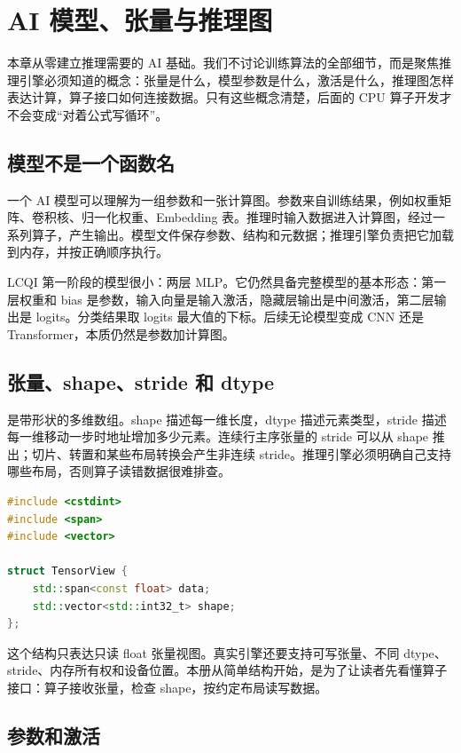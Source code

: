 \chapter{AI 模型、张量与推理图}

本章从零建立推理需要的 AI 基础。我们不讨论训练算法的全部细节，而是聚焦推理引擎必须知道的概念：张量是什么，模型参数是什么，激活是什么，推理图怎样表达计算，算子接口如何连接数据。只有这些概念清楚，后面的 CPU 算子开发才不会变成“对着公式写循环”。

\section{模型不是一个函数名}

一个 AI 模型可以理解为一组参数和一张计算图。参数来自训练结果，例如权重矩阵、卷积核、归一化权重、Embedding 表。推理时输入数据进入计算图，经过一系列算子，产生输出。模型文件保存参数、结构和元数据；推理引擎负责把它加载到内存，并按正确顺序执行。

LCQI 第一阶段的模型很小：两层 MLP。它仍然具备完整模型的基本形态：第一层权重和 bias 是参数，输入向量是输入激活，隐藏层输出是中间激活，第二层输出是 logits。分类结果取 logits 最大值的下标。后续无论模型变成 CNN 还是 Transformer，本质仍然是参数加计算图。

\section{张量、shape、stride 和 dtype}

 是带形状的多维数组。shape 描述每一维长度，dtype 描述元素类型，stride 描述每一维移动一步时地址增加多少元素。连续行主序张量的 stride 可以从 shape 推出；切片、转置和某些布局转换会产生非连续 stride。推理引擎必须明确自己支持哪些布局，否则算子读错数据很难排查。

\begin{lstlisting}[language=C++,caption={教学版张量视图：shape 和连续数据}]
#include <cstdint>
#include <span>
#include <vector>

struct TensorView {
    std::span<const float> data;
    std::vector<std::int32_t> shape;
};
\end{lstlisting}

这个结构只表达只读 float 张量视图。真实引擎还要支持可写张量、不同 dtype、stride、内存所有权和设备位置。本册从简单结构开始，是为了让读者先看懂算子接口：算子接收张量，检查 shape，按约定布局读写数据。

\section{参数和激活}

